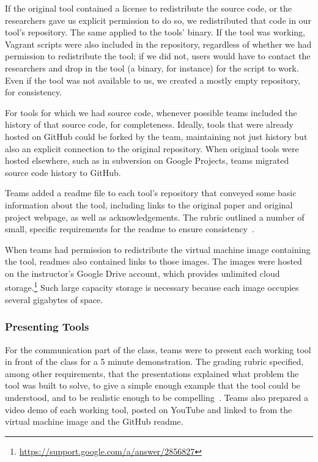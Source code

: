 \documentclass[10pt,conference]{IEEEtran}
\begin{document}
If the original tool contained a license to redistribute
the source code, or the researchers gave us explicit
permission to do so, we redistributed that code 
in our tool's repository.
The same applied to the tools' binary.
If the tool was working, 
Vagrant scripts were also included in the repository,
regardless of whether we had permission to redistribute
the tool; if we did not, users would have to contact the 
researchers and drop in the tool (a binary, for instance)
for the script to work.
Even if the tool was not available to us, we created
a mostly empty repository, for consistency.


For tools for which we had source code,
whenever possible teams included the history
of that source code, for completeness.
Ideally, tools that were already hosted
on GitHub could be forked by the team,
maintaining not just history but also an 
explicit connection to the original repository.
When original tools were hosted elsewhere, such
as in subversion on Google Projects, 
teams migrated source code history to GitHub.

Teams added a readme file to each tool's repository
that conveyed some basic information about
the tool, including 
links to the original paper and
original project webpage, 
as well as acknowledgements.
The rubric outlined a number of small,
specific requirements for the readme to
ensure consistency~\cite{github}.

When teams had permission to redistribute
the virtual machine image containing the tool,
readmes also contained links to those images.
The images were hosted on the instructor's 
Google Drive account, which provides unlimited
cloud storage.\footnote{\url{https://support.google.com/a/answer/2856827}}
Such large capacity storage is necessary because each
image occupies several gigabytes of space.

\subsubsection{Presenting Tools}

For the communication part of the class,
teams were to present each working tool in front of the class
for a 5 minute demonstration.
The grading rubric specified, among other requirements,
that the presentations explained what problem the 
tool was built to solve, to give a simple enough
example that the tool could be understood,
and to be realistic enough to be 
compelling~\cite{presentation}.
Teams also prepared a video demo of each working tool,
posted on YouTube and linked to from the virtual machine
image and the GitHub readme.
\end{document}
